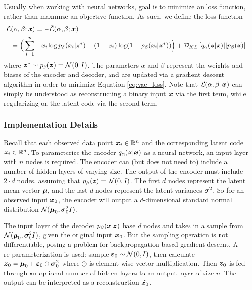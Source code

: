 Usually when working with neural networks, goal is to minimize an loss function, rather than maximize an objective function. As such, we define the loss function 
\begin{equation}
  \label{eq:vae_loss}
  \begin{split}
  \mathcal{L}&(\alpha, \beta; \boldsymbol{x}) = - \tilde{\mathcal{L}}(\alpha, \beta;\boldsymbol{x}) \\
  &= \Big(\sum_{i=1}^n - x_i\log p_\beta(x_i | \boldsymbol{z}^*) - (1-x_i)\log (1-p_\beta(x_i | \boldsymbol{z}^*)) \Big) + \mathcal{D}_{KL}\left[ q_\alpha(\boldsymbol{z} | \boldsymbol{x}) || p_\beta(\boldsymbol{z}) \right]
  \end{split}
\end{equation}
where $\boldsymbol{z}^* \sim p_\beta(\boldsymbol{z}) = \mathcal{N}(0,I)$. The parameters $\alpha$ and $\beta$ represent the weights and biases of the encoder and decoder, and are updated via a gradient descent algorithm in order to minimize Equation \ref{eq:vae_loss}. Note that $\mathcal{L}(\alpha, \beta; \boldsymbol{x})$ can simply be understood as reconstructing a binary input $\boldsymbol{x}$ via the first term, while regularizing on the latent code via the second term.


\subsubsection{Implementation Details}
Recall that each observed data point $\boldsymbol{x}_i \in \mathbb{R}^n$ and the corresponding latent code $\boldsymbol{z}_i \in \mathbb{R}^d$. To parameterize the encoder $q_\alpha(\boldsymbol{z} | \boldsymbol{x})$ as a neural network, an input layer with $n$ nodes is required. The encoder can (but does not need to) include a number of hidden layers of varying size. The output of the encoder must include $2\cdot d$ nodes, assuming that $p_\beta(\boldsymbol{z}) = \mathcal{N}(0,I)$. The first $d$ nodes represent the latent mean vector $\boldsymbol{\mu}$, and the last $d$ nodes represent the latent variances $\boldsymbol{\sigma}^2$. So for an observed input $\boldsymbol{x}_0$, the encoder will output a $d$-dimensional standard normal distribution $\mathcal{N}(\boldsymbol{\mu}_0, \boldsymbol{\sigma}_0^2I)$.

The input layer of the decoder $p_\beta(\boldsymbol{x} | \boldsymbol{z})$ hase $d$ nodes and takes in a sample from $\mathcal{N}(\boldsymbol{\mu}_0, \boldsymbol{\sigma}_0^2I)$, given the original input $\boldsymbol{x}_0$. But the sampling operation is not differentiable, posing a problem for backpropagation-based gradient descent. A re-parameterization is used: sample $\boldsymbol{\varepsilon}_0 \sim \mathcal{N}(0,I)$, then calculate $\boldsymbol{z}_0 = \boldsymbol{\mu}_0 + \boldsymbol{\varepsilon}_0 \odot \boldsymbol{\sigma}_0^2$ where $\odot$ is element-wise vector multiplication. Then $\boldsymbol{z}_0$ is fed through an optional number of hidden layers to an output layer of size $n$. The output can be interpreted as a reconstruction $\hat{\boldsymbol{x}_0}$.

